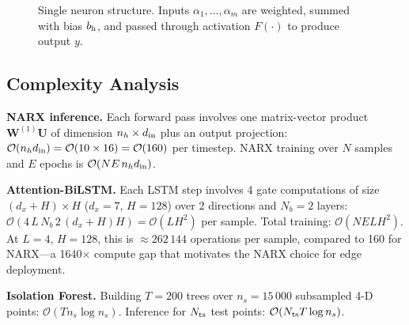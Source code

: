 \documentclass[journal]{IEEEtran}
\begin{document}
\begin{figure}[!t]
\centering
{}
\caption{Single neuron structure. Inputs $\alpha_1,\ldots,\alpha_m$
  are weighted, summed with bias $b_{\rm h}$, and passed through
  activation $F(\cdot)$ to produce output $y$.}
\label{fig:neuron}
\end{figure}

\subsection{Complexity Analysis}
\label{sec:complexity}

\textbf{NARX inference.}
Each forward pass involves one matrix-vector product
$\mathbf{W}^{(1)}\mathbf{U}$ of dimension $n_h\times d_{\rm in}$
plus an output projection:
$\mathcal{O}(n_h d_{\rm in}) = \mathcal{O}(10\times16) = \mathcal{O}(160)$
per timestep.
NARX training over $N$ samples and $E$ epochs is
$\mathcal{O}(N E\,n_h d_{\rm in})$.

\textbf{Attention-BiLSTM.}
Each LSTM step involves 4 gate computations of size
$(d_x+H)\times H$ ($d_x=7$, $H=128$) over 2 directions and
$N_b=2$ layers:
$\mathcal{O}(4\,L\,N_b\,2\,(d_x+H)H)=\mathcal{O}(L H^2)$
per sample.
Total training: $\mathcal{O}(N E L H^2)$.
At $L=4$, $H=128$, this is $\approx 262\,144$ operations per sample,
compared to 160 for NARX---a 1640$\times$ compute gap that
motivates the NARX choice for edge deployment.

\textbf{Isolation Forest.}
Building $T=200$ trees over $n_s=15\,000$ subsampled 4-D points:
$\mathcal{O}(T n_s \log n_s)$.
Inference for $N_{\rm ts}$ test points:
$\mathcal{O}(N_{\rm ts} T \log n_s)$.
\end{document}
